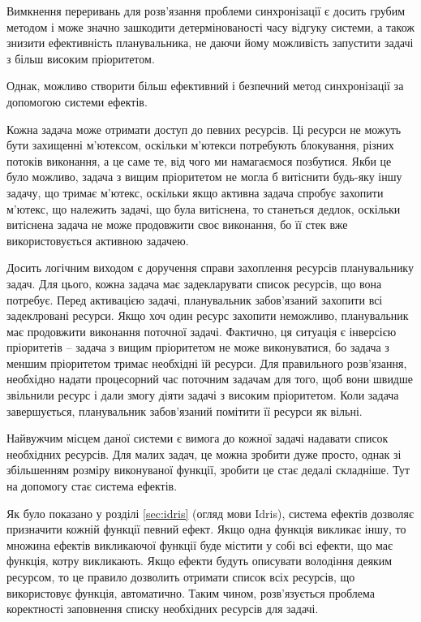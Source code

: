 \documentclass[main.tex]{subfiles}
\begin{document}
Вимкнення переривань для розв'язання проблеми синхронізації є досить грубим методом і може значно зашкодити детермінованості часу відгуку системи, а також знизити ефективність планувальника, не даючи йому можливість запустити задачі з більш високим пріоритетом.

Однак, можливо створити більш ефективний і безпечний метод синхронізації за допомогою системи ефектів.

Кожна задача може отримати доступ до певних ресурсів. Ці ресурси не можуть бути захищенні м'ютексом, оскільки м'ютекси потребують блокування, різних потоків виконання, а це саме те, від чого ми намагаємося позбутися. Якби це було можливо, задача з вищим пріоритетом не могла б витіснити будь-яку іншу задачу, що тримає м'ютекс, оскільки якщо активна задача спробує захопити м'ютекс, що належить задачі, що була витіснена, то станеться дедлок, оскільки витіснена задача не може продовжити своє виконання, бо її стек вже використовується активною задачею.

Досить логічним виходом є доручення справи захоплення ресурсів планувальнику задач. Для цього, кожна задача має задекларувати список ресурсів, що вона потребує. Перед активацією задачі, планувальник забов'язаний захопити всі задеклровані ресурси. Якщо хоч один ресурс захопити неможливо, планувальник має продовжити виконання поточної задачі. Фактично, ця ситуація є інверсією пріоритетів -- задача з вищим пріоритетом не може виконуватися, бо задача з меншим пріоритетом тримає необхідні їй ресурси. Для правильного розв'язання, необхідно надати процесорний час поточним задачам для того, щоб вони швидше звільнили ресурс і дали змогу діяти задачі з високим пріоритетом. Коли задача завершується, планувальник забов'язаний помітити її ресурси як вільні.

Найвужчим місцем даної системи є вимога до кожної задачі надавати список необхідних ресурсів. Для малих задач, це можна зробити дуже просто, однак зі збільшенням розміру виконуваної функції, зробити це стає дедалі складніше. Тут на допомогу стає система ефектів.

Як було показано у розділі \ref{sec:idris} (огляд мови Idris), система ефектів дозволяє призначити кожній функції певний ефект. Якщо одна функція викликає іншу, то множина ефектів викликаючої функції буде містити у собі всі ефекти, що має функція, котру викликають. Якщо ефекти будуть описувати володіння деяким ресурсом, то це правило дозволить отримати список всіх ресурсів, що використовує функція, автоматично. Таким чином, розв'язується проблема коректності заповнення списку необхідних ресурсів для задачі.
\end{document}

